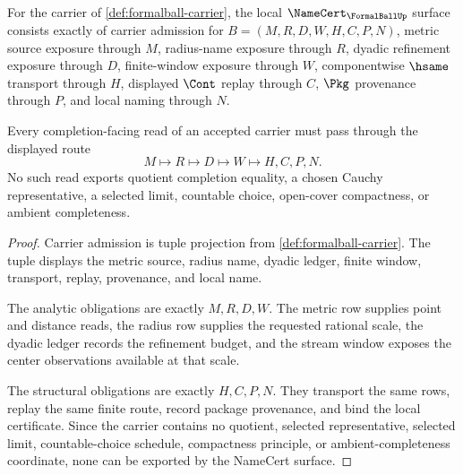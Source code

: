 \begin{theorem}
\label{thm:formalball-namecert-obligations}
For the carrier of \autoref{def:formalball-carrier}, the local $\NameCert_{\FormalBallUp}$ surface consists exactly of carrier admission for $B=(M,R,D,W,H,C,P,N)$, metric source exposure through $M$, radius-name exposure through $R$, dyadic refinement exposure through $D$, finite-window exposure through $W$, componentwise $\hsame$ transport through $H$, displayed $\Cont$ replay through $C$, $\Pkg$ provenance through $P$, and local naming through $N$.

Every completion-facing read of an accepted carrier must pass through the displayed route
$$
M\longmapsto R\longmapsto D\longmapsto W\longmapsto H,C,P,N .
$$
No such read exports quotient completion equality, a chosen Cauchy representative, a selected limit, countable choice, open-cover compactness, or ambient completeness.
\end{theorem}
\begin{proof}
Carrier admission is tuple projection from \autoref{def:formalball-carrier}. The tuple displays the metric source, radius name, dyadic ledger, finite window, transport, replay, provenance, and local name.

The analytic obligations are exactly $M,R,D,W$. The metric row supplies point and distance reads, the radius row supplies the requested rational scale, the dyadic ledger records the refinement budget, and the stream window exposes the center observations available at that scale.

The structural obligations are exactly $H,C,P,N$. They transport the same rows, replay the same finite route, record package provenance, and bind the local certificate. Since the carrier contains no quotient, selected representative, selected limit, countable-choice schedule, compactness principle, or ambient-completeness coordinate, none can be exported by the NameCert surface.
\end{proof}

